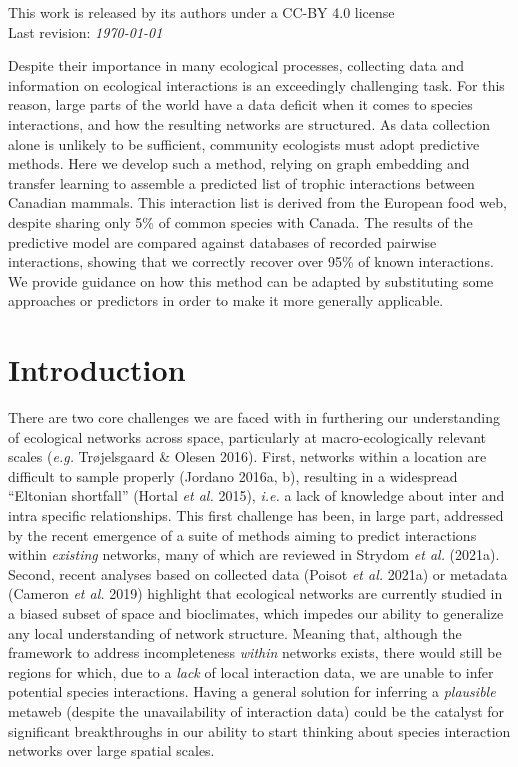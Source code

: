 \documentclass[11pt]{article}
\begin{document}
\vfill
This work is released by its authors under a CC-BY 4.0 license\hfill\ccby\\
Last revision: \emph{\today}

\clearpage
\thispagestyle{empty}

\vfill
Despite their importance in many ecological processes, collecting data
and information on ecological interactions is an exceedingly challenging
task. For this reason, large parts of the world have a data deficit when
it comes to species interactions, and how the resulting networks are
structured. As data collection alone is unlikely to be sufficient,
community ecologists must adopt predictive methods. Here we develop such
a method, relying on graph embedding and transfer learning to assemble a
predicted list of trophic interactions between Canadian mammals. This
interaction list is derived from the European food web, despite sharing
only 5\% of common species with Canada. The results of the predictive
model are compared against databases of recorded pairwise interactions,
showing that we correctly recover over 95\% of known interactions. We
provide guidance on how this method can be adapted by substituting some
approaches or predictors in order to make it more generally applicable.



\vfill

\clearpage
\linenumbers
\pagestyle{normal}

\hypertarget{introduction}{%
\section{Introduction}\label{introduction}}

There are two core challenges we are faced with in furthering our
understanding of ecological networks across space, particularly at
macro-ecologically relevant scales (\emph{e.g.} Trøjelsgaard \& Olesen
2016). First, networks within a location are difficult to sample
properly (Jordano 2016a, b), resulting in a widespread ``Eltonian
shortfall'' (Hortal \emph{et al.} 2015), \emph{i.e.} a lack of knowledge
about inter and intra specific relationships. This first challenge has
been, in large part, addressed by the recent emergence of a suite of
methods aiming to predict interactions within \emph{existing} networks,
many of which are reviewed in Strydom \emph{et al.} (2021a). Second,
recent analyses based on collected data (Poisot \emph{et al.} 2021a) or
metadata (Cameron \emph{et al.} 2019) highlight that ecological networks
are currently studied in a biased subset of space and bioclimates, which
impedes our ability to generalize any local understanding of network
structure. Meaning that, although the framework to address
incompleteness \emph{within} networks exists, there would still be
regions for which, due to a \emph{lack} of local interaction data, we
are unable to infer potential species interactions. Having a general
solution for inferring a \emph{plausible} metaweb (despite the
unavailability of interaction data) could be the catalyst for
significant breakthroughs in our ability to start thinking about species
interaction networks over large spatial scales.
\end{document}
